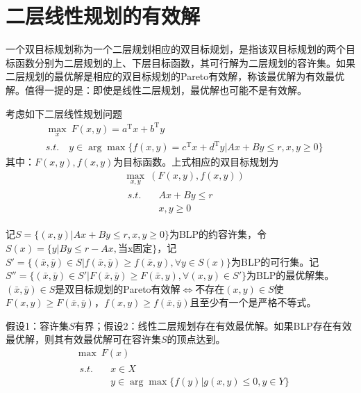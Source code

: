 \section{二层线性规划的有效解}
    \par
    一个双目标规划称为一个二层规划相应的双目标规划，是指该双目标规划的两个目标函数分别为二层规划的上、下层目标函数，其可行解为二层规划的容许集。如果二层规划的最优解是相应的双目标规划的Pareto有效解，称该最优解为有效最优解。值得一提的是：即使是线性二层规划，最优解也可能不是有效解。
    \par
    考虑如下二层线性规划问题
    \begin{align*}
        &\mathop{\max}\limits_{x}\  F(x,y)=a^\mathrm{T} x+b^\mathrm{T} y\\
        &s.t.\quad y \in \arg{}\max\{f(x,y)=c^\mathrm{T} x+d^\mathrm{T} y|Ax+By\leqslant r,x,y\geqslant 0\}
    \end{align*}
    其中：$F(x,y),f(x,y)$为目标函数。上式相应的双目标规划为
    \begin{align*}
        &\mathop{\max}\limits_{x,y}\  (F(x,y),f(x,y))\\
        & \begin{aligned}
        s.t.\quad& Ax+By\leqslant r\\
        & x,y \geqslant 0
        \end{aligned}
    \end{align*}
    \par
    记$S=\{(x,y)|Ax+By\leqslant r,x,y\geqslant 0\}$为BLP的约容许集，令$S(x)=\{y|By\leqslant r-Ax,\text{当x固定}\}$，记$S'=\{(\bar{x},\bar{y})\in S|f(\bar{x},\bar{y})\geqslant f(\bar{x},{y}),\forall y \in S(x)\}$为BLP的可行集。记$S''=\{(\bar{x},\bar{y})\in S'|F(\bar{x},\bar{y})\geqslant F(\bar{x},{y}),\forall (x,y) \in S'\}$为BLP的最优解集。$(\bar{x},\bar{y})\in S$是双目标规划的Pareto有效解$\Leftrightarrow$不存在$(x,y)\in S$使$F(x,y)\geqslant F(\bar{x},\bar{y})$，$f(x,y)\geqslant f(\bar{x},\bar{y})$且至少有一个是严格不等式。
    \par
    假设1：容许集$S$有界；假设2：线性二层规划存在有效最优解。如果BLP存在有效最优解，则其有效最优解可在容许集$S$的顶点达到。
    \begin{align*}
        &\mathop{\max}\ F(x)\\
        &\begin{aligned}
        s.t.\quad & x\in X\\
        &y \in \arg\max\{f(y)|g(x,y)\leqslant 0,y\in Y\}
        \end{aligned}
    \end{align*}
